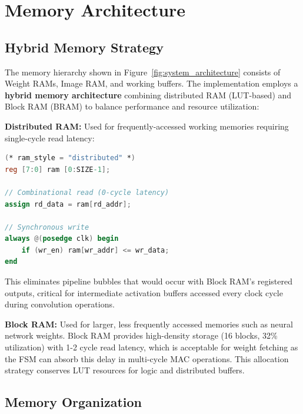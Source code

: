 \documentclass[12pt,a4paper]{report}
\begin{document}
\section{Memory Architecture}

\subsection{Hybrid Memory Strategy}

The memory hierarchy shown in Figure~\ref{fig:system_architecture} consists of Weight RAMs, Image RAM, and working buffers. The implementation employs a \textbf{hybrid memory architecture} combining distributed RAM (LUT-based) and Block RAM (BRAM) to balance performance and resource utilization:

\textbf{Distributed RAM:} Used for frequently-accessed working memories requiring single-cycle read latency:

\begin{lstlisting}[language=Verilog, caption=Distributed RAM Template]
(* ram_style = "distributed" *)
reg [7:0] ram [0:SIZE-1];

// Combinational read (0-cycle latency)
assign rd_data = ram[rd_addr];

// Synchronous write
always @(posedge clk) begin
    if (wr_en) ram[wr_addr] <= wr_data;
end
\end{lstlisting}

This eliminates pipeline bubbles that would occur with Block RAM's registered outputs, critical for intermediate activation buffers accessed every clock cycle during convolution operations.

\textbf{Block RAM:} Used for larger, less frequently accessed memories such as neural network weights. Block RAM provides high-density storage (16 blocks, 32\% utilization) with 1-2 cycle read latency, which is acceptable for weight fetching as the FSM can absorb this delay in multi-cycle MAC operations. This allocation strategy conserves LUT resources for logic and distributed buffers.

\subsection{Memory Organization}
\end{document}
